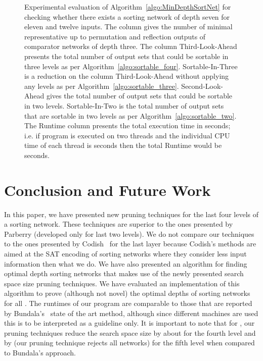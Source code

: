 \documentclass[13pt,a4paper]{article}
\begin{document}
\begin{figure} [H]
\centering
{}
\caption{Experimental evaluation of Algorithm~\ref{algo:MinDepthSortNet} for checking whether there exists a sorting network of depth seven for eleven and twelve inputs. The column  gives the number of minimal representative up to permutation and reflection outputs of comparator networks of depth three. The column Third-Look-Ahead presents the total number of output sets that could be sortable in three levels as per Algorithm~\ref{algo:sortable_four}. Sortable-In-Three is a reduction on the column Third-Look-Ahead without applying any levels as per Algorithm~\ref{algo:sortable_three}. Second-Look-Ahead gives the total number of output sets that could be sortable in two levels. Sortable-In-Two is the total number of output sets that are sortable in two levels as per Algorithm~\ref{algo:sortable_two}. The Runtime column presents the total execution time in seconds; i.e. if program is executed on two threads and the individual CPU time of each thread is  seconds then the total Runtime would be  seconds. }
\label{fig:experiments}
\end{figure}


\section{Conclusion and Future Work}

In this paper, we have presented new pruning techniques for the last four levels of a sorting network. These techniques are superior to the ones presented by Parberry (developed only for last two levels). We do not compare our techniques to the ones presented by Codish~\cite{CodishCS14a_The_End_Game} for the last layer because Codish's methods are aimed at the SAT encoding of sorting networks where they consider less input information then what we do. We have also presented an algorithm for finding optimal depth sorting networks that makes use of the newly presented search space size pruning techniques. We have evaluated an implementation of this algorithm to prove (although not novel) the optimal depths of sorting networks for all . The runtimes of our program are comparable to those that are reported by Bundala's~\cite{BundalaCCSZ14_Optimal_Depth} state of the art method, although since different machines are used this is to be interpreted as a guideline only. It is important to note that for , our pruning techniques reduce the search space size by about  for the fourth level and by  (our pruning technique rejects all networks) for the fifth level when compared to Bundala's approach. 
\end{document}
